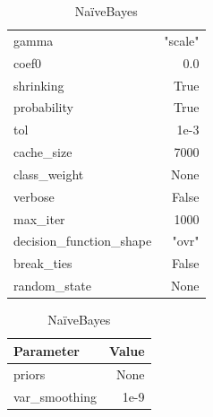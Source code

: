 \begin{table}[H]
\begin{subtable}[t]{.35\linewidth}
\begin{tabular}{lr}
            gamma & "scale" \\
            coef0 & 0.0 \\
            shrinking & True \\
            probability & True \\
            tol & 1e-3 \\
            cache\_size & 7000 \\
            class\_weight & None \\
            verbose & False \\
            max\_iter & 1000 \\
            decision\_function\_shape & "ovr" \\
            break\_ties & False \\
            random\_state & None \\\bottomrule
        \end{tabular}
    \end{subtable}%
    \begin{subtable}[t]{.23\linewidth}
        \caption{NaïveBayes \cite{noauthor_sklearnnaive_bayesgaussiannb_nodate}}
        \centering
        \begin{tabular}{lr}\toprule
            Parameter & Value \\\midrule
            priors & None \\
            var\_smoothing & 1e-9 \\\bottomrule
        \end{tabular}
    \end{subtable}%
\end{table}


